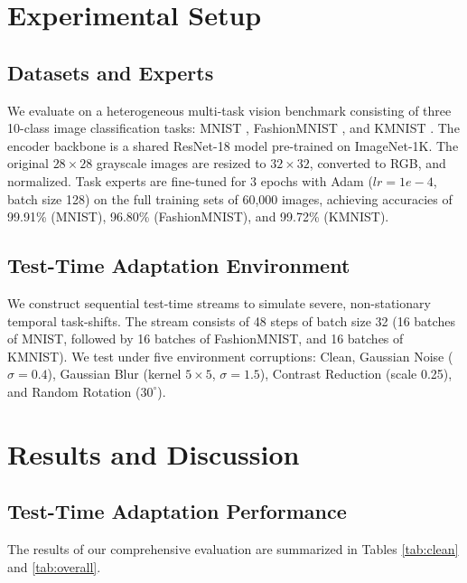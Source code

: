 \documentclass{article}
\theoremstyle{plain}
\theoremstyle{definition}
\theoremstyle{remark}
\begin{document}
\section{Experimental Setup}
\label{sec:experiments}
\subsection{Datasets and Experts}
We evaluate on a heterogeneous multi-task vision benchmark consisting of three 10-class image classification tasks: MNIST \cite{mnist}, FashionMNIST \cite{fashionmnist}, and KMNIST \cite{kmnist}.
The encoder backbone is a shared ResNet-18 model \cite{resnet} pre-trained on ImageNet-1K. The original $28 \times 28$ grayscale images are resized to $32 \times 32$, converted to RGB, and normalized. 
Task experts are fine-tuned for 3 epochs with Adam ($lr=1e-4$, batch size 128) on the full training sets of 60,000 images, achieving accuracies of 99.91\% (MNIST), 96.80\% (FashionMNIST), and 99.72\% (KMNIST).

\subsection{Test-Time Adaptation Environment}
We construct sequential test-time streams to simulate severe, non-stationary temporal task-shifts. The stream consists of 48 steps of batch size 32 (16 batches of MNIST, followed by 16 batches of FashionMNIST, and 16 batches of KMNIST).
We test under five environment corruptions: Clean, Gaussian Noise ($\sigma=0.4$), Gaussian Blur (kernel $5 \times 5$, $\sigma=1.5$), Contrast Reduction (scale 0.25), and Random Rotation ($30^\circ$).

\section{Results and Discussion}
\label{sec:results}
\subsection{Test-Time Adaptation Performance}
The results of our comprehensive evaluation are summarized in Tables \ref{tab:clean} and \ref{tab:overall}.
\end{document}
